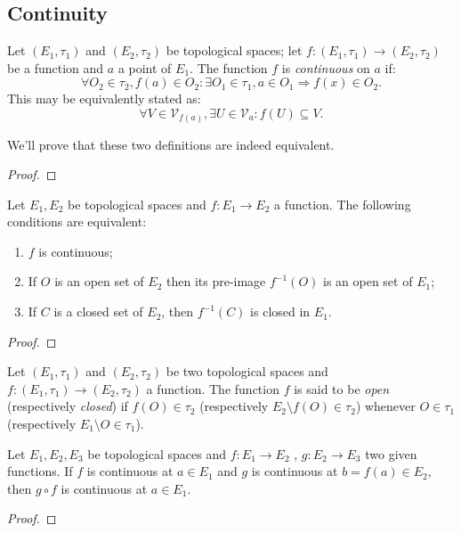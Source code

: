 \subsection{Continuity}

\begin{definition}
	Let $(E_1, \tau_1)$ and $(E_2, \tau_2)$ be topological spaces; let $f : (E_1, \tau_1) \to (E_2, \tau_2)$ be a function and $a$ a point of $E_1$. The function $f$ is \emph{continuous} on $a$ if:
	\begin{equation*}
		\forall O_2 \in \tau_2, f(a) \in O_2: \exists O_1 \in \tau_1, a \in O_1 \Rightarrow f(x) \in O_2.	
	\end{equation*}
	This may be equivalently stated as:
	\begin{equation*}
		\forall V \in \mathcal{V}_{f(a)} , \exists U \in \mathcal{V}_a : f(U) \subseteq V.	
	\end{equation*}
\end{definition}
We'll prove that these two definitions are indeed equivalent.
\begin{proof}
\end{proof}

\begin{theorem}
Let $E_1, E_2$ be topological spaces and $f : E_1 \to E_2$ a function. The following conditions are equivalent:
\begin{enumerate}
	\item $f$ is continuous;
	\item If $O$ is an open set of $E_2$ then its pre-image $f^{-1}(O)$ is an open set of $E_1$;
	\item If $C$ is a closed set of $E_2$, then $f^{-1}(C)$ is closed in $E_1$.
\end{enumerate}
\end{theorem}
\begin{proof}
\end{proof}

\begin{definition}
	Let $(E_1, \tau_1)$ and $(E_2, \tau_2)$ be two topological spaces and $f : (E_1, \tau_1) \to (E_2, \tau_2)$ a function. The function $f$ is said to be \emph{open} (respectively \emph{closed}) if $f(O) \in \tau_2$ (respectively $E_2 \setminus f(O) \in \tau_2$) whenever $O \in \tau_1$ (respectively $E_1 \setminus O \in \tau_1$).	
\end{definition}

\begin{theorem}
	Let $E_1, E_2, E_3$ be topological spaces and $f: E_1 \to E_2$ , $g: E_2 \to E_3$ two given functions. If $f$ is continuous at $a \in E_1$ and $g$ is continuous at $b = f(a) \in E_2$, then $g \circ f$ is continuous at $a \in E_1$.	
\end{theorem}
\begin{proof}
\end{proof}

